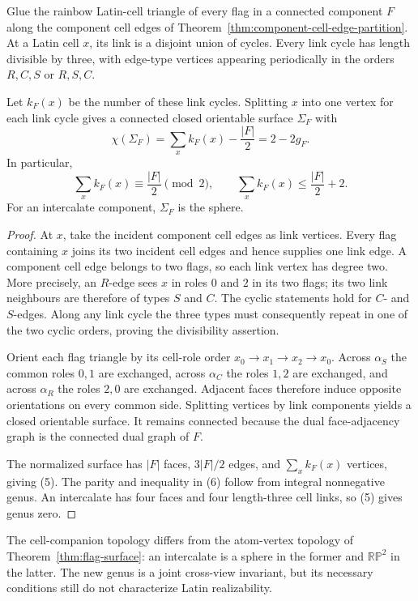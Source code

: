 \begin{theorem}
\label{thm:cell-companion-surface}
Glue the rainbow Latin-cell triangle of every flag in a connected component
$F$ along the component cell edges of
Theorem~\ref{thm:component-cell-edge-partition}.  At a Latin cell $x$, its
link is a disjoint union of cycles.  Every link cycle has length divisible by
three, with edge-type vertices appearing periodically in the orders
$R,C,S$ or $R,S,C$.

Let $k_F(x)$ be the number of these link cycles.  Splitting $x$ into one
vertex for each link cycle gives a connected closed orientable surface
$\Sigma_F$ with
\[
 \chi(\Sigma_F)=\sum_x k_F(x)-\frac{|F|}{2}=2-2g_F. \tag{5}
\]
In particular,
\[
 \sum_xk_F(x)\equiv\frac{|F|}{2}\pmod2,
 \qquad
 \sum_xk_F(x)\leq\frac{|F|}{2}+2. \tag{6}
\]
For an intercalate component, $\Sigma_F$ is the sphere.
\end{theorem}

\begin{proof}
At $x$, take the incident component cell edges as link vertices.  Every flag
containing $x$ joins its two incident cell edges and hence supplies one link
edge.  A component cell edge belongs to two flags, so each link vertex has
degree two.  More precisely, an $R$-edge sees $x$ in roles $0$ and $2$ in
its two flags; its two link neighbours are therefore of types $S$ and $C$.
The cyclic statements hold for $C$- and $S$-edges.  Along any link cycle the
three types must consequently repeat in one of the two cyclic orders, proving
the divisibility assertion.

Orient each flag triangle by its cell-role order
$x_0\to x_1\to x_2\to x_0$.  Across $\alpha_S$ the common roles $0,1$ are
exchanged, across $\alpha_C$ the roles $1,2$ are exchanged, and across
$\alpha_R$ the roles $2,0$ are exchanged.  Adjacent faces therefore induce
opposite orientations on every common side.  Splitting vertices by link
components yields a closed orientable surface.  It remains connected because
the dual face-adjacency graph is the connected dual graph of $F$.

The normalized surface has $|F|$ faces, $3|F|/2$ edges, and
$\sum_xk_F(x)$ vertices, giving (5).  The parity and inequality in (6) follow
from integral nonnegative genus.  An intercalate has four faces and four
length-three cell links, so (5) gives genus zero.
\end{proof}

The cell-companion topology differs from the atom-vertex topology of
Theorem~\ref{thm:flag-surface}: an intercalate is a sphere in the former and
$\mathbb{RP}^2$ in the latter.  The new genus is a joint cross-view invariant,
but its necessary conditions still do not characterize Latin realizability.

